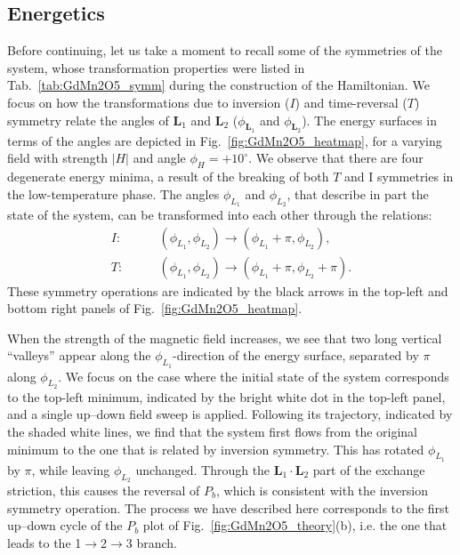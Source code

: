 \subsection{Energetics \label{sec:GdMn2O5_energetics}}
Before continuing, let us take a moment to recall some of the symmetries of the system, whose transformation properties were listed in Tab.~\ref{tab:GdMn2O5_symm} during the construction of the Hamiltonian.
We focus on how the transformations due to inversion ($I$) and time-reversal ($T$) symmetry relate the angles of $\bm L_1$ and $\bm L_2$ ($\phi_{\bm L_1}$ and $\phi_{\bm L_2}$).
The energy surfaces in terms of the angles are depicted in Fig.~\ref{fig:GdMn2O5_heatmap}, for a varying field with strength $|H|$ and angle $\phi_H = +10^\circ$.
We observe that there are four degenerate energy minima, a result of the breaking of both $T$ and I symmetries in the low-temperature phase.
The angles $\phi_{L_1}$ and $\phi_{L_2}$, that describe in part the state of the system, can be transformed into each other through the relations:
\begin{align}
	I:\qquad &(\phi_{L_1}, \phi_{L_2}) \rightarrow (\phi_{L_1}+\pi, \phi_{L_2}),\\
	T:\qquad &(\phi_{L_1}, \phi_{L_2})\rightarrow(\phi_{L_1}+\pi, \phi_{L_2}+\pi).
\end{align}
These symmetry operations are indicated by the black arrows in the top-left and bottom right panels of Fig.~\ref{fig:GdMn2O5_heatmap}.
\begin{figure*}[h!]
	\centering
	\caption{{\bf Energy surfaces in terms of $(\phi_{L_1}, \phi_{L_2})$ for $\phi_H =+10^\circ$.} The shaded dots denote the four degenerate minima, related by time-reversal ($T$) and inversion ($I$) symmetry operations indicated by the black arrows. The full white dot corresponds to the example situation discussed in the main text. An indication of its trajectory during a double up--down field sweep is given by the shaded lines.\label{fig:GdMn2O5_heatmap}}
\end{figure*}

When the strength of the magnetic field increases, we see that two long vertical ``valleys'' appear along the $\phi_{L_1}$-direction of the energy surface, separated by $\pi$ along $\phi_{L_2}$.
We focus on the case where the initial state of the system corresponds to the top-left minimum, indicated by the bright white dot in the top-left panel, and a single up--down field sweep is applied.
Following its trajectory, indicated by the shaded white lines, we find that the system first flows from the original minimum to the one that is related by inversion symmetry.
This has rotated $\phi_{L_1}$ by $\pi$, while leaving $\phi_{L_2}$ unchanged.
Through the $\bm L_1 \cdot \bm L_2$ part of the exchange striction, this causes the reversal of $P_b$, which is consistent with the inversion symmetry operation.
The process we have described here corresponds to the first up--down cycle of the $P_b$ plot of Fig.~\ref{fig:GdMn2O5_theory}(b), i.e. the one that leads to the 1$\rightarrow$2$\rightarrow$3 branch.

